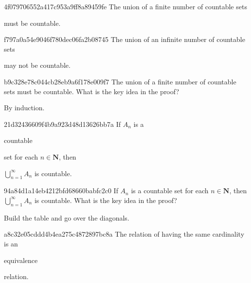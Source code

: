 \begin{note}{4f079706552a417c953a9ff8a89459fe}
    The union of a finite number of countable sets \begin{icloze}{1}must be countable.\end{icloze}
\end{note}

\begin{note}{f797a0a54e9046f780dec06fa2b08745}
    The union of an infinite number of countable sets \begin{icloze}{1}may not be countable.\end{icloze}
\end{note}

\begin{note}{b9c328e78c044cb28eb9a6f178e009f7}
    The union of a finite number of countable sets must be countable.
    What is the key idea in the proof?

    \begin{cloze}{1}
        By induction.
    \end{cloze}
\end{note}

\begin{note}{21d32436609f4b9a923d48d13626bb7a}
    If \({ A_n }\) is a \begin{icloze}{2}countable\end{icloze} set for each \({ n \in \mathbf{N} }\), then \begin{icloze}{1}\({ \bigcup_{n=1}^{\infty}A_n }\) is countable.\end{icloze}
\end{note}

\begin{note}{94a84d1a14eb4212bfd68660babfc2c0}
    If \({ A_n }\) is a countable set for each \({ n \in \mathbf{N} }\), then \({ \bigcup_{n=1}^{\infty}A_n }\) is countable.
    What is the key idea in the proof?

    \begin{cloze}{1}
        Build the table and go over the diagonals.
    \end{cloze}
\end{note}

\begin{note}{a8c32e05cddd4b4ea275c4872897bc8a}
    The relation of having the same cardinality is an \begin{icloze}{1}equivalence\end{icloze} relation.
\end{note}

